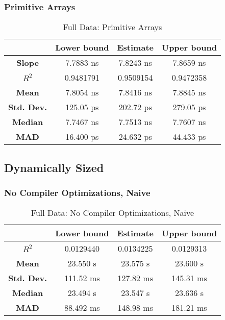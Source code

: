 \subsubsection{Primitive Arrays}
\begin{table}[H]
\centering
\begin{tabular}{|c|c|c|c|}
\hline
\textbf{} & \textbf{Lower bound} & \textbf{Estimate} & \textbf{Upper bound} \\
\hline
\textbf{Slope} & 7.7883 ns & 7.8243 ns & 7.8659 ns \\
\hline
\textbf{$R^2$} & 0.9481791 & 0.9509154 & 0.9472358 \\
\hline
\textbf{Mean} & 7.8054 ns & 7.8416 ns & 7.8845 ns \\
\hline
\textbf{Std. Dev.} & 125.05 ps & 202.72 ps & 279.05 ps \\
\hline
\textbf{Median} & 7.7467 ns & 7.7513 ns & 7.7607 ns \\
\hline
\textbf{MAD} & 16.400 ps & 24.632 ps & 44.433 ps \\
\hline
\end{tabular}
\caption{Full Data: Primitive Arrays}
\end{table}


\subsection{Dynamically Sized}

\subsubsection{No Compiler Optimizations, Naive}
\begin{table}[H]
\centering
\begin{tabular}{|c|c|c|c|}
\hline
\textbf{} & \textbf{Lower bound} & \textbf{Estimate} & \textbf{Upper bound} \\
\hline
\textbf{$R^2$} & 0.0129440 & 0.0134225 & 0.0129313 \\
\hline
\textbf{Mean} & 23.550 s & 23.575 s & 23.600 s \\
\hline
\textbf{Std. Dev.} & 111.52 ms & 127.82 ms & 145.31 ms \\
\hline
\textbf{Median} & 23.494 s & 23.547 s & 23.636 s \\
\hline
\textbf{MAD} & 88.492 ms & 148.98 ms & 181.21 ms \\
\hline
\end{tabular}
\caption{Full Data: No Compiler Optimizations, Naive}
\end{table}


